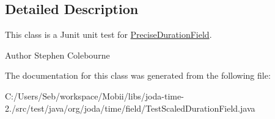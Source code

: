 \subsection{Detailed Description}
This class is a Junit unit test for \hyperlink{classorg_1_1joda_1_1time_1_1field_1_1_precise_duration_field}{Precise\-Duration\-Field}.

\begin{DoxyAuthor}{Author}
Stephen Colebourne 
\end{DoxyAuthor}


The documentation for this class was generated from the following file\-:\begin{DoxyCompactItemize}
\item 
C\-:/\-Users/\-Seb/workspace/\-Mobii/libs/joda-\/time-\/2./src/test/java/org/joda/time/field/Test\-Scaled\-Duration\-Field.\-java\end{DoxyCompactItemize}
